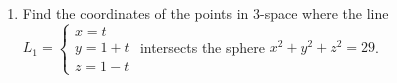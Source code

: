 \documentclass[12pt]{article}
\newif\ifans
\begin{document}
\begin{enumerate}
\begin{enumerate}
\ifans{\fbox{$(x,y,z)=\left(0,\frac{9}{2},\frac{1}{2}\right)$}} \fi

\end{enumerate}

\item Find the coordinates of the points in 3-space where the line $L_1=\left\{\begin{array}{l}
x=t\\y=1+t\\
z=1-t\end{array}\right.$ intersects the sphere $x^2+y^2+z^2=29$.

\ifans{\fbox{$(x,y,z)=(3,4,-2)$ and $(x,y,z)=(-3,-2,4)$}} \fi

\end{enumerate}

\end{document}
